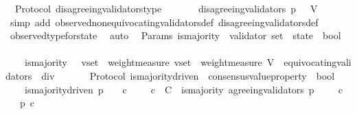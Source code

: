 \begin{isabellebody}
\isanewline
{}\isamarkupfalse%
\ {\isacharparenleft}\ Protocol{\isacharparenright}\ disagreeing{\isacharunderscore}validators{\isacharunderscore}type\ {\isacharcolon}\isanewline
\ \ {\isachardoublequoteopen}{\isasymforall}\ {\isasymsigma}\ {\isasymin}\ {\isasymSigma}{\isachardot}\ disagreeing{\isacharunderscore}validators\ {\isacharparenleft}p{\isacharcomma}\ {\isasymsigma}{\isacharparenright}\ {\isasymsubseteq}\ V{\isachardoublequoteclose}\isanewline
%
\isadelimproof
\ \ %
\endisadelimproof
%
\isatagproof
{}\isamarkupfalse%
\ {\isacharparenleft}simp\ add{\isacharcolon}\ observed{\isacharunderscore}non{\isacharunderscore}equivocating{\isacharunderscore}validators{\isacharunderscore}def\ disagreeing{\isacharunderscore}validators{\isacharunderscore}def{\isacharparenright}\isanewline
\ \ \isamarkupfalse%
\ observed{\isacharunderscore}type{\isacharunderscore}for{\isacharunderscore}state\ \isamarkupfalse%
\ auto%
\endisatagproof
{\isafoldproof}%
%
\isadelimproof
\isanewline
%
\endisadelimproof
\isanewline
\isanewline
\isanewline
{}\isamarkupfalse%
\ {\isacharparenleft}\ Params{\isacharparenright}\ is{\isacharunderscore}majority\ {\isacharcolon}{\isacharcolon}\ {\isachardoublequoteopen}{\isacharparenleft}validator\ set\ {\isacharasterisk}\ state{\isacharparenright}\ {\isasymRightarrow}\ bool{\isachardoublequoteclose}\isanewline
\ \ \isanewline
\ \ \ \ {\isachardoublequoteopen}is{\isacharunderscore}majority\ \ {\isacharequal}\ {\isacharparenleft}{\isasymlambda}{\isacharparenleft}v{\isacharunderscore}set{\isacharcomma}\ {\isasymsigma}{\isacharparenright}{\isachardot}\ {\isacharparenleft}weight{\isacharunderscore}measure\ v{\isacharunderscore}set\ {\isachargreater}\ {\isacharparenleft}weight{\isacharunderscore}measure\ {\isacharparenleft}V\ {\isacharminus}\ equivocating{\isacharunderscore}validators\ {\isasymsigma}{\isacharparenright}{\isacharparenright}\ div\ {}{\isacharparenright}{\isacharparenright}{\isachardoublequoteclose}\isanewline
\ \ \ \isanewline
\isanewline
{}\isamarkupfalse%
\ {\isacharparenleft}\ Protocol{\isacharparenright}\ is{\isacharunderscore}majority{\isacharunderscore}driven\ {\isacharcolon}{\isacharcolon}\ {\isachardoublequoteopen}consensus{\isacharunderscore}value{\isacharunderscore}property\ {\isasymRightarrow}\ bool{\isachardoublequoteclose}\isanewline
\ \ \isanewline
\ \ \ \ {\isachardoublequoteopen}is{\isacharunderscore}majority{\isacharunderscore}driven\ p\ {\isacharequal}\ {\isacharparenleft}{\isasymforall}\ {\isasymsigma}\ c{\isachardot}\ {\isasymsigma}\ {\isasymin}\ {\isasymSigma}\ {\isasymand}\ c\ {\isasymin}\ C\ {\isasymand}\ is{\isacharunderscore}majority\ {\isacharparenleft}agreeing{\isacharunderscore}validators\ {\isacharparenleft}p{\isacharcomma}\ {\isasymsigma}{\isacharparenright}{\isacharcomma}\ {\isasymsigma}{\isacharparenright}\ {\isasymlongrightarrow}\ {\isacharparenleft}{\isasymforall}\ c\ {\isasymin}\ {\isasymepsilon}\ {\isasymsigma}{\isachardot}\ p\ c{\isacharparenright}{\isacharparenright}{\isachardoublequoteclose}\isanewline

\end{isabellebody}
